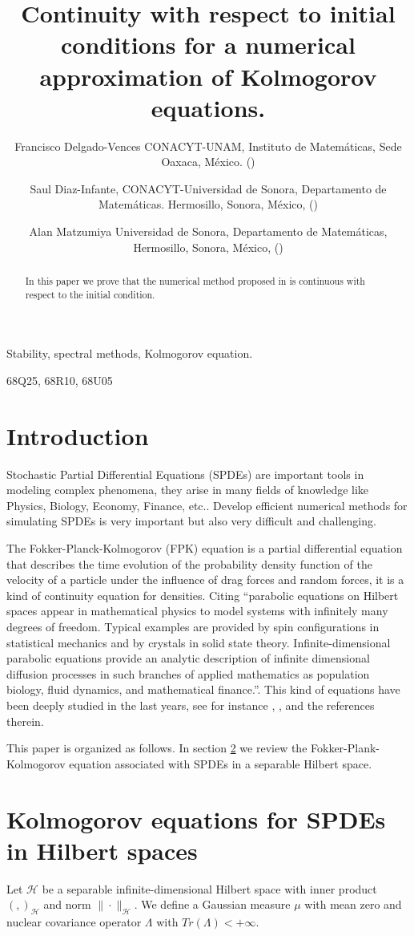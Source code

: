 \documentclass[review, onefignum, onetabnum]{siamart171218}
\title{%
    Continuity with respect to initial conditions for a numerical
    approximation of Kolmogorov equations.
}
\author{
    Francisco Delgado-Vences
    CONACYT-UNAM,
    Instituto de Matem\'aticas,
    Sede Oaxaca, M\'exico.
    (\email{delgado@im.unam.mx})
%
    \and
    Saul Diaz-Infante,
    CONACYT-Universidad
    de Sonora, Departamento de Matem\'aticas.
    Hermosillo, Sonora, M\'exico,
    (\email{saul.diazinfante@unison.mx})
%
    \and
    Alan Matzumiya
    Universidad de Sonora,
    Departamento de Matem\'aticas,
    Hermosillo, Sonora, M\'exico,
    (\email{alan.matzumiya@gmail.com})
}
\begin{document}
\maketitle

\begin{abstract}
    In this paper we prove that the numerical method proposed in \cite{de-fl}
    is continuous with respect to the initial condition.
\end{abstract}

\begin{keywords}
    Stability, spectral methods, Kolmogorov equation.
\end{keywords}

\begin{AMS}
  68Q25, 68R10, 68U05
\end{AMS}

\section{Introduction}
    Stochastic Partial Differential Equations (SPDEs) are important tools in
modeling complex phenomena, they arise in many fields of knowledge like
Physics, Biology, Economy, Finance, etc.. Develop efficient numerical
methods for simulating SPDEs is very important but also very difficult and
challenging.

    The  Fokker-Planck-Kolmogorov (FPK) equation is a partial differential
equation that describes the time evolution of the probability density function
of the velocity of a particle under the influence of drag forces and random
forces, it is a kind of continuity equation for densities. Citing \cite{da-za}
``parabolic equations on Hilbert spaces appear in mathematical physics to model
systems with infinitely many degrees of freedom. Typical examples are provided
by spin configurations in statistical mechanics and by crystals in solid state
theory. Infinite-dimensional parabolic equations provide an analytic description
of infinite dimensional diffusion processes in such branches of applied
mathematics as population biology, fluid dynamics, and mathematical finance.''.
This kind of equations have been deeply studied in the last years, see for
instance \cite{bo-da-ro}, \cite{da-fl-ro}, \cite{da} and the references therein.

    This paper is organized as follows. In section \ref{fpk-sect} we review the
Fokker-Plank-Kolmogorov equation associated with SPDEs in
a separable Hilbert space.

\section{Kolmogorov equations for SPDEs in Hilbert spaces}\label{fpk-sect}
    Let $\mathcal{H}$ be a separable infinite-dimensional Hilbert space with
inner product $( ,  )_\mathcal{H} $ and norm $\|\cdot\|_\mathcal{H}$. We define
a Gaussian measure $\mu$ with mean zero and nuclear covariance operator
$\Lambda$ with  $Tr(\Lambda)<+\infty$.
\end{document}
